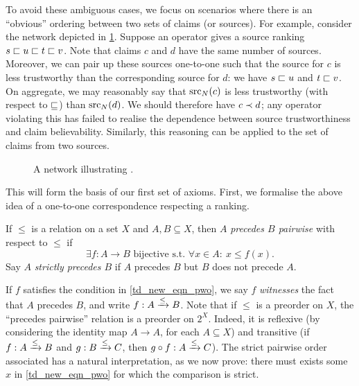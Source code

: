 To avoid these ambiguous cases, we focus on scenarios where there is an
``obvious'' ordering between two sets of claims (or sources). For example,
consider the network depicted in \cref{td_new_fig_coherence_intro}. Suppose an
operator gives a source ranking $s \sqsubset u \sqsubset t \sqsubset v$. Note that claims $c$
and $d$ have the same number of sources. Moreover, we can pair up these sources
one-to-one such that the source for $c$ is less trustworthy than the
corresponding source for $d$: we have $s \sqsubset u$ and $t \sqsubset v$. On aggregate,
we may reasonably say that $\operatorname{src}_N(c)$ is less trustworthy (with respect to
$\sqsubseteq$) than $\operatorname{src}_N(d)$. We should therefore have $c \prec d$; any operator
violating this has failed to realise the dependence between source
trustworthiness and claim believability. Similarly, this reasoning can be
applied to the set of claims from two sources.

\begin{figure}
    \centering

    \caption{
        A network illustrating \claimcoherence{}.
    }
    \label{td_new_fig_coherence_intro}
\end{figure}

This will form the basis of our first set of axioms. First, we formalise the
above idea of a one-to-one correspondence respecting a ranking.

\begin{definition}
    If $\le$ is a relation on a set $X$ and $A, B \subseteq X$, then $A$
    \emph{precedes $B$ pairwise} with respect to $\le$ if
    \begin{equation}
        \label{td_new_eqn_pwo}
        \exists f: A \to B \text{ bijective s.t. }
        \forall x \in A:\ x \le f(x).
    \end{equation}
    Say $A$ \emph{strictly precedes $B$} if $A$ precedes $B$ but $B$ does not
    precede $A$.
\end{definition}

If $f$ satisfies the condition in \cref{td_new_eqn_pwo}, we say $f$
\emph{witnesses} the fact that $A$ precedes $B$, and write
${f}:{A} \xrightarrow{\le} {B}$.  Note that if $\le$ is a preorder on $X$, the
``precedes pairwise'' relation is a preorder on $2^X$.  Indeed, it is reflexive
(by considering the identity map $A \to A$, for each $A \subseteq X$) and
transitive (if ${f}:{A} \xrightarrow{\le} {B}$ and ${g}:{B} \xrightarrow{\le} {C}$, then
${g \circ f}:{A} \xrightarrow{\le} {C}$). The strict pairwise order associated has a
natural interpretation, as we now prove: there must exists some $x$ in
\cref{td_new_eqn_pwo} for which the comparison is strict.

